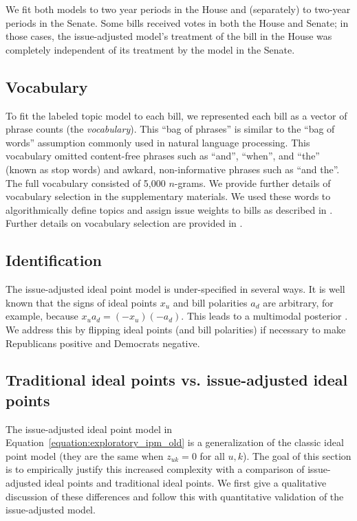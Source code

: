 We fit both models to two year periods in the House and (separately)
to two-year periods in the Senate.  Some bills received votes in both
the House and Senate; in those cases, the issue-adjusted model's
treatment of the bill in the House was completely independent of its
treatment by the model in the Senate.

\subsection{Vocabulary}
To fit the labeled topic model to each bill, we represented each bill
as a vector of phrase counts (the \emph{vocabulary}).  This ``bag of
phrases'' is similar to the ``bag of words'' assumption commonly used
in natural language processing.  This vocabulary omitted content-free
phrases such as ``and'', ``when'', and ``the'' (known as stop words)
and awkard, non-informative phrases such as ``and the''.  The full
vocabulary consisted of 5,000 $n$-grams. We provide further details of
vocabulary selection in the supplementary materials.  We used these
words to algorithmically define topics and assign issue weights to
bills as described in .  Further details on vocabulary
selection are provided in .

\subsection{Identification}
The issue-adjusted ideal point model is under-specified in
several ways.  It is well known that the signs of ideal points $x_u$
and bill polarities $a_d$ are arbitrary, for example, because $x_u a_d
= (-x_u)(-a_d)$. This leads to a multimodal posterior
\citep{jackman:2001}.  We address this by flipping ideal points (and
bill polarities) if necessary to make Republicans positive and
Democrats negative.

\subsection{Traditional ideal points vs. issue-adjusted ideal points}

\label{section:jackman_vs_exploratory}
The issue-adjusted ideal point model in
Equation~\ref{equation:exploratory_ipm_old} is a generalization of the
classic ideal point model (they are the same when $z_{uk}=0$ for all
$u,k$). The goal of this section is to empirically justify this
increased complexity with a comparison of issue-adjusted ideal points
and traditional ideal points.  We first give a qualitative discussion
of these differences and follow this with quantitative validation of
the issue-adjusted model.

